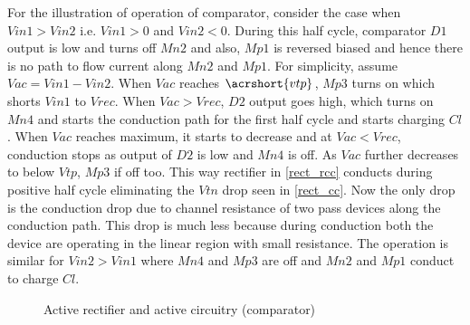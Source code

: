 \documentclass[12pt,a4paper,UKenglish]{article}
\begin{document}
For the illustration of operation of comparator, consider the case when $Vin1 > Vin2$ i.e. $Vin1 > 0$ and $Vin2 < 0$. During this half cycle, comparator $D1$ output is low and turns off $Mn2$ and also, $Mp1$ is reversed biased and hence there is no path to flow current along $Mn2$ and $Mp1$. For simplicity, assume $Vac =  Vin1 - Vin2$. When $Vac$ reaches $\acrshort{vtp}$, $Mp3$ turns on which shorts $Vin1$ to $Vrec$. When $Vac > Vrec$, $D2$ output goes high, which turns on $Mn4$ and starts the conduction path for the first half cycle and starts charging $Cl$. When $Vac$ reaches maximum, it starts to decrease and at $Vac < Vrec$, conduction stops as output of $D2$ is low and $Mn4$ is off. As $Vac$ further decreases to below $Vtp$, $Mp3$ if off too. This way rectifier in \ref{rect_rcc}  conducts during positive half cycle eliminating the $Vtn$ drop seen in \ref{rect_cc}. Now the only drop is the conduction drop due to channel resistance of two pass devices along the conduction path. This drop is much less because during conduction both the device are operating in the linear region with small resistance. The operation is similar for $Vin2 > Vin1$ where $Mn4$ and $Mp3$ are off and $Mn2$ and $Mp1$ conduct to charge $Cl$. 

\begin{figure} [H]
  \centering 
  \hfill
 \caption{Active rectifier and active circuitry (comparator)} 
\label{rect_rcc_rcc} 
\end{figure}
\end{document}
